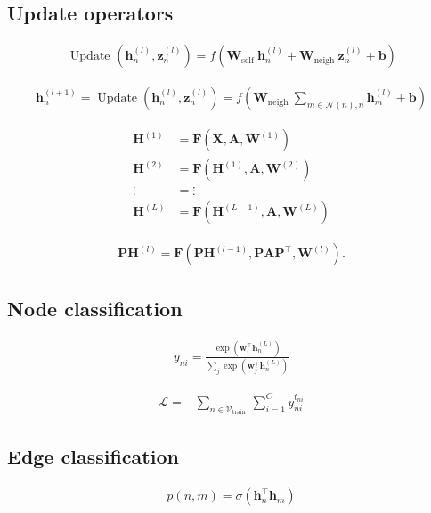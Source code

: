 \documentclass{article}
\begin{document}
\subsection{Update operators}
\begin{align*}
\text{ Update }\left(\mathbf{h}_{n}^{(l)}, \mathbf{z}_{n}^{(l)}\right)=f\left(\mathbf{W}_{\text{self }} \mathbf{h}_{n}^{(l)}+\mathbf{W}_{\text{neigh }} \mathbf{z}_{n}^{(l)}+\mathbf{b}\right) \tag{13.16}
\end{align*}

\begin{align*}
\mathbf{h}_{n}^{(l+1)}=\operatorname{Update}\left(\mathbf{h}_{n}^{(l)}, \mathbf{z}_{n}^{(l)}\right)=f\left(\mathbf{W}_{\text{neigh }} \sum_{m \in \mathcal{N}(n), n} \mathbf{h}_{m}^{(l)}+\mathbf{b}\right) \tag{13.17}
\end{align*}

\begin{align*}
\mathbf{H}^{(1)} & =\mathbf{F}\left(\mathbf{X}, \mathbf{A}, \mathbf{W}^{(1)}\right) \\
\mathbf{H}^{(2)} & =\mathbf{F}\left(\mathbf{H}^{(1)}, \mathbf{A}, \mathbf{W}^{(2)}\right) \\
\vdots & =\vdots  \tag{13.18}\\
\mathbf{H}^{(L)} & =\mathbf{F}\left(\mathbf{H}^{(L-1)}, \mathbf{A}, \mathbf{W}^{(L)}\right)
\end{align*}

\begin{align*}
\mathbf{P} \mathbf{H}^{(l)}=\mathbf{F}\left(\mathbf{P} \mathbf{H}^{(l-1)}, \mathbf{P} \mathbf{A} \mathbf{P}^{\top}, \mathbf{W}^{(l)}\right) . \tag{13.19}
\end{align*}

\subsection{Node classification}
\begin{align*}
y_{n i}=\frac{\exp \left(\mathbf{w}_{i}^{\top} \mathbf{h}_{n}^{(L)}\right)}{\sum_{j} \exp \left(\mathbf{w}_{j}^{\top} \mathbf{h}_{n}^{(L)}\right)} \tag{13.20}
\end{align*}

\begin{align*}
\mathcal{L}=-\sum_{n \in \mathcal{V}_{\text{train }}} \sum_{i=1}^{C} y_{n i}^{t_{n i}} \tag{13.21}
\end{align*}

\subsection{Edge classification}
\begin{align*}
p(n, m)=\sigma\left(\mathbf{h}_{n}^{\top} \mathbf{h}_{m}\right) \tag{13.22}
\end{align*}
\end{document}
